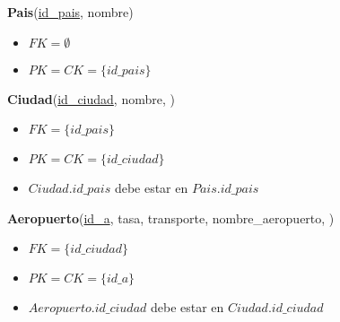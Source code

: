 \vspace*{0.1cm}
\noindent
\textbf{Pais}(\underline{id\_pais}, nombre)
\begin{itemize}[noitemsep]
	\item $FK = \emptyset$
	\item $PK = CK = \{id\_pais\}$
\end{itemize}

\noindent
\textbf{Ciudad}(\underline{id\_ciudad}, nombre, )
\begin{itemize}[noitemsep]
	\item $FK = \{id\_pais\}$
	\item $PK = CK = \{id\_ciudad\}$
	\item $Ciudad.id\_pais$ debe estar en $Pais.id\_pais$
\end{itemize}

\vspace*{0.1cm}
\noindent
\textbf{Aeropuerto}(\underline{id\_a}, tasa, transporte, 
			nombre\_aeropuerto, )
\begin{itemize}[noitemsep]
	\item $FK = \{id\_ciudad\}$
	\item $PK = CK = \{id\_a\}$
	\item $Aeropuerto.id\_ciudad$ debe estar en $Ciudad.id\_ciudad$
\end{itemize}

  



